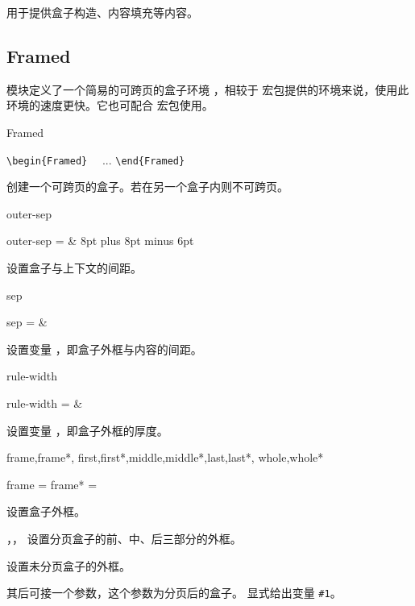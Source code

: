 \documentclass[twoside]{book}
\begin{document}
 用于提供盒子构造、内容填充等内容。


\subsection{Framed}

 模块定义了一个简易的可跨页的盒子环境 ，相较于 
 宏包提供的环境来说，使用此环境的速度更快。它也可配合 
宏包使用。

\begin{function}[type=environment]{Framed}
  \begin{syntax}
    \verb|\begin{Framed}| 
    ~~... 
    \verb|\end{Framed}|
  \end{syntax}
创建一个可跨页的盒子。若在另一个盒子内则不可跨页。
\end{function}

\begin{keyval}[path=frame]{outer-sep}
  \begin{syntax}
    outer-sep =  & 8pt plus 8pt minus 6pt 
  \end{syntax}
设置盒子与上下文的间距。
\end{keyval}

\begin{keyval}[path=frame]{sep}
  \begin{syntax}
    sep =  & \V{3\fboxsep}
  \end{syntax}
设置变量 ，即盒子外框与内容的间距。
\end{keyval}

\begin{keyval}[path=frame]{rule-width}
  \begin{syntax}
    rule-width =  & \V\fboxrule
  \end{syntax}
设置变量 ，即盒子外框的厚度。
\end{keyval}

\begin{keyval}[path=frame]{frame,frame*,
  first,first*,middle,middle*,last,last*,
  whole,whole*}
  \begin{syntax}
    frame  = 
    frame* = 
  \end{syntax}
 设置盒子外框。

，， 设置分页盒子的前、中、后三部分的外框。

 设置未分页盒子的外框。

 其后可接一个参数，这个参数为分页后的盒子。
 显式给出变量 \verb|#1|。
\end{keyval}
\end{document}
